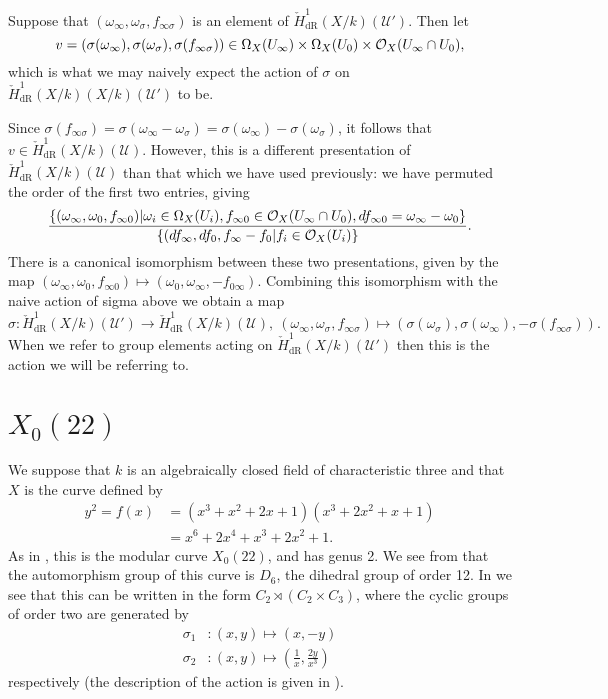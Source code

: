 \documentclass[draft, 11pt]{article} %
\theoremstyle{plain}
\theoremstyle{remark}
\newcommand{\cO}{{\cal O}}
\newcommand{\ra}{\rightarrow}
\newcommand{\cU}{{\mathcal U}}
\newcommand{\cechderhamhone}{\check{H}_{\text {dR}}^1(X/k)}
\begin{document}
Suppose that $(\omega_\infty , \omega_\sigma, f_{\infty \sigma})$ is an element of $\cechderhamhone(\cU')$.
Then let
\[
v= (\sigma(\omega_\infty), \sigma(\omega_\sigma), \sigma(f_{\infty \sigma})) \in \Omega_X(U_\infty) \times \Omega_X(U_0) \times \cO_X(U_\infty \cap U_0),
\]
which is what we may naively expect the action of $\sigma$ on $\cechderhamhone(X/k)(\cU')$ to be.

Since $\sigma(f_{\infty \sigma}) = \sigma(\omega_\infty - \omega_\sigma) =\sigma(\omega_\infty) - \sigma(\omega_\sigma)$, it follows that $v \in \cechderhamhone(\cU)$.
However, this is a different presentation of $\cechderhamhone(\cU)$ than that which we have used previously: we have permuted the order of the first two entries, giving
\[
\frac{ \left\{ (\omega_\infty, \omega_0, f_{\infty 0}) | \omega_i \in\Omega_X(U_i), f_{\infty 0}\in \cO_X(U_\infty \cap U_0), df_{\infty 0} = \omega_\infty - \omega_0 \right\} } {\left\{ (df_\infty, df_0, f_\infty - f_0 | f_i \in \cO_X(U_i) \right\} }.
\]
There is a canonical isomorphism between these two presentations, given by the map $(\omega_\infty, \omega_0, f_{\infty 0}) \mapsto (\omega_0, \omega_\infty, -f_{0 \infty})$.
Combining this isomorphism with the naive action of sigma above we obtain a map 
\[
\sigma\colon \cechderhamhone(\cU') \ra \cechderhamhone(\cU),\  (\omega_\infty, \omega_\sigma, f_{\infty \sigma}) \mapsto (\sigma(\omega_\sigma), \sigma(\omega_\infty), -\sigma(f_{\infty \sigma})).
\]
When we refer to group elements acting on $\cechderhamhone(\cU')$ then this is the action we will be referring to.


\section{$X_0(22)$}

We suppose that $k$ is an algebraically closed field of characteristic three and that $X$ is the curve defined by
\begin{align*}
y^2 = f(x)  & = (x^3 + x^2 + 2x + 1)(x^3 + 2x^2 + x + 1)\nonumber \\
& = x^6 + 2x^4 + x^3 + 2x^2 + 1.
\end{align*}
As in \cite[Table 2]{automorphismshyperellipticmodular}, this is the modular curve $X_0(22)$, and has genus 2.
We see from \cite[Table 1]{automorphismshyperellipticmodular} that the automorphism group of this curve is $D_6$, the dihedral group of order 12.
In \cite[\S 3.3]{automorphismshyperellipticmodular} we see that this can be written in the form $C_2 \rtimes (C_2 \times C_3)$, where the cyclic groups of order two are generated by
\begin{align*}
\sigma_1 & \colon (x,y) \mapsto (x,-y) \\
\sigma_2 & \colon (x,y) \mapsto \left( \frac{1}{x}, \frac{2y}{x^3} \right)
\end{align*}
respectively (the description of the action is given in \cite[Table 1]{automorphismshyperellipticmodular}).
\end{document}
